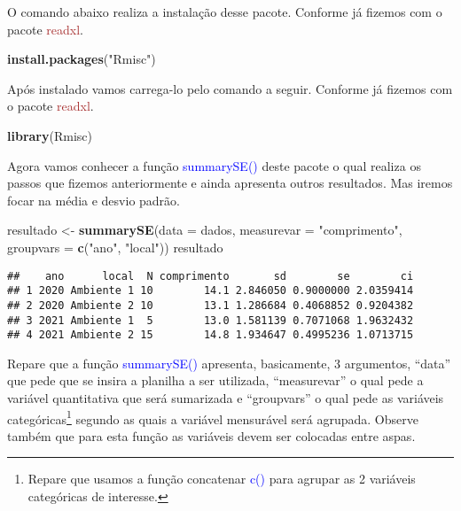 \documentclass[14pt,titlepage, oneside, openany, a4paper]{book}
\newenvironment{Shaded}{\begin{snugshade}}{\end{snugshade}}
\newcommand{\DataTypeTok}[1]{\textcolor[rgb]{0.13,0.29,0.53}{#1}}
\newcommand{\KeywordTok}[1]{\textcolor[rgb]{0.13,0.29,0.53}{\textbf{#1}}}
\newcommand{\NormalTok}[1]{#1}
\newcommand{\StringTok}[1]{\textcolor[rgb]{0.31,0.60,0.02}{#1}}
\begin{document}
O comando abaixo realiza a instalação desse pacote. Conforme já fizemos com o pacote \textcolor{brown}{readxl}.

\begin{Shaded}
\begin{Highlighting}[]
\KeywordTok{install.packages}\NormalTok{(}\StringTok{"Rmisc"}\NormalTok{)}
\end{Highlighting}
\end{Shaded}

Após instalado vamos carrega-lo pelo comando a seguir. Conforme já fizemos com o pacote \textcolor{brown}{readxl}.

\begin{Shaded}
\begin{Highlighting}[]
\KeywordTok{library}\NormalTok{(Rmisc)}
\end{Highlighting}
\end{Shaded}

Agora vamos conhecer a função \textcolor{blue}{summarySE()} deste pacote o qual realiza os passos que fizemos anteriormente e ainda apresenta outros resultados. Mas iremos focar na média e desvio padrão.

\begin{Shaded}
\begin{Highlighting}[]
\NormalTok{resultado <-}\StringTok{ }\KeywordTok{summarySE}\NormalTok{(}\DataTypeTok{data =}\NormalTok{ dados, }
                       \DataTypeTok{measurevar =} \StringTok{"comprimento"}\NormalTok{, }
                       \DataTypeTok{groupvars =} \KeywordTok{c}\NormalTok{(}\StringTok{"ano"}\NormalTok{, }\StringTok{"local"}\NormalTok{))}
\NormalTok{resultado}
\end{Highlighting}
\end{Shaded}

\begin{verbatim}
##    ano      local  N comprimento       sd        se        ci
## 1 2020 Ambiente 1 10        14.1 2.846050 0.9000000 2.0359414
## 2 2020 Ambiente 2 10        13.1 1.286684 0.4068852 0.9204382
## 3 2021 Ambiente 1  5        13.0 1.581139 0.7071068 1.9632432
## 4 2021 Ambiente 2 15        14.8 1.934647 0.4995236 1.0713715
\end{verbatim}

Repare que a função \textcolor{blue}{summarySE()} apresenta, basicamente, 3 argumentos, ``data'' que pede que se insira a planilha a ser utilizada, ``measurevar'' o qual pede a variável quantitativa que será sumarizada e ``groupvars'' o qual pede as variáveis categóricas\footnote{Repare que usamos a função concatenar \textcolor{blue}{c()} para agrupar as 2 variáveis categóricas de interesse.} segundo as quais a variável mensurável será agrupada. Observe também que para esta função as variáveis devem ser colocadas entre aspas.
\end{document}

